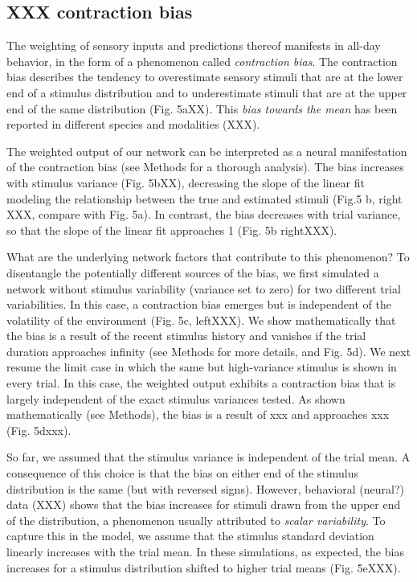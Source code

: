 \documentclass[10pt,a4paper,draft]{article}
\begin{document}
\subsection*{XXX contraction bias}
% 
The weighting of sensory inputs and predictions thereof manifests in all-day behavior, in the form of a phenomenon called \textit{contraction bias}. The contraction bias describes the tendency to overestimate sensory stimuli that are at the lower end of a stimulus distribution and to underestimate stimuli that are at the upper end of the same distribution (Fig. 5aXX). This \textit{bias towards the mean} has been reported in different species and modalities (XXX). 

The weighted output of our network can be interpreted as a neural manifestation of the contraction bias (see Methods for a thorough analysis). The bias increases with stimulus variance (Fig. 5bXX), decreasing the slope of the linear fit modeling the relationship between the true and estimated stimuli (Fig.5 b, right XXX, compare with Fig. 5a). In contrast, the bias decreases with trial variance, so that the slope of the linear fit approaches 1 (Fig. 5b rightXXX).

What are the underlying network factors that contribute to this phenomenon? To disentangle the potentially different sources of the bias, we first simulated a network without stimulus variability (variance set to zero) for two different trial variabilities. In this case, a contraction bias emerges but is independent of the volatility of the environment (Fig. 5c, leftXXX). We show mathematically that the bias is a result of the recent stimulus history and vanishes if the trial duration approaches infinity (see Methods for more details, and Fig. 5d). We next resume the limit case in which the same but high-variance stimulus is shown in every trial. In this case, the weighted output exhibits a contraction bias that is largely independent of the exact stimulus variances tested. As shown mathematically (see Methods), the bias is a result of xxx and approaches xxx (Fig. 5dxxx). 

So far, we assumed that the stimulus variance is independent of the trial mean. A consequence of this choice is that the bias on either end of the stimulus distribution is the same (but with reversed signs). However, behavioral (neural?) data (XXX) shows that the bias increases for stimuli drawn from the upper end of the distribution, a phenomenon usually attributed to \textit{scalar variability}. To capture this in the model, we assume that the stimulus standard deviation linearly increases with the trial mean. In these simulations, as expected, the bias increases for a stimulus distribution shifted to higher trial means (Fig. 5eXXX).
\end{document}
